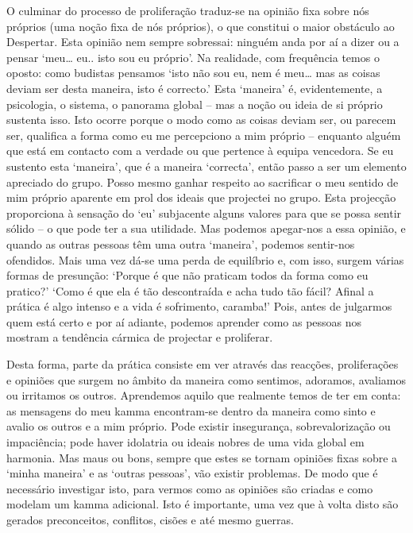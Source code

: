 O culminar do processo de proliferação traduz-se na opinião fixa sobre nós próprios (uma noção fixa de nós próprios), o que constitui o maior obstáculo ao Despertar. Esta opinião nem sempre sobressai: ninguém anda por aí a dizer ou a pensar `meu\ldots{} eu.. isto sou eu próprio'. Na realidade, com frequência temos o oposto: como budistas pensamos `isto não sou eu, nem é meu\ldots{} mas as coisas deviam ser desta maneira, isto é correcto.' Esta `maneira' é, evidentemente, a psicologia, o sistema, o panorama global -- mas a noção ou ideia de si próprio sustenta isso. Isto ocorre porque o modo como as coisas deviam ser, ou parecem ser, qualifica a forma como eu me percepciono a mim próprio -- enquanto alguém que está em contacto com a verdade ou que pertence à equipa vencedora. Se eu sustento esta `maneira', que é a maneira `correcta', então passo a ser um elemento apreciado do grupo. Posso mesmo ganhar respeito ao sacrificar o meu sentido de mim próprio aparente em prol dos ideais que projectei no grupo. Esta projecção proporciona à sensação do `eu' subjacente alguns valores para que se possa sentir sólido -- o que pode ter a sua utilidade. Mas podemos apegar-nos a essa opinião, e quando as outras pessoas têm uma outra `maneira', podemos sentir-nos ofendidos. Mais uma vez dá-se uma perda de equilíbrio e, com isso, surgem várias formas de presunção: `Porque é que não praticam todos da forma como eu pratico?' `Como é que ela é tão descontraída e acha tudo tão fácil? Afinal a prática é algo intenso e a vida é sofrimento, caramba!' Pois, antes de julgarmos quem está certo e por aí adiante, podemos aprender como as pessoas nos mostram a tendência cármica de projectar e proliferar.

Desta forma, parte da prática consiste em ver através das reacções, proliferações e opiniões que surgem no âmbito da maneira como sentimos, adoramos, avaliamos ou irritamos os outros. Aprendemos aquilo que realmente temos de ter em conta: as mensagens do meu kamma encontram-se dentro da maneira como sinto e avalio os outros e a mim próprio. Pode existir insegurança, sobrevalorização ou impaciência; pode haver idolatria ou ideais nobres de uma vida global em harmonia. Mas maus ou bons, sempre que estes se tornam opiniões fixas sobre a `minha maneira' e as `outras pessoas', vão existir problemas. De modo que é necessário investigar isto, para vermos como as opiniões são criadas e como modelam um kamma adicional. Isto é importante, uma vez que à volta disto são gerados preconceitos, conflitos, cisões e até mesmo guerras.

